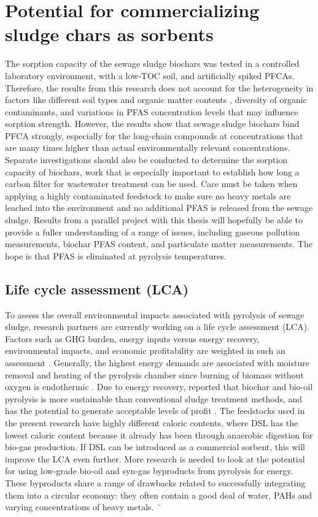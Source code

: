 \section{Potential for commercializing sludge chars as sorbents}
The sorption capacity of the sewage sludge biochars was tested in a controlled laboratory environment, with a low-TOC soil, and artificially spiked PFCAs. Therefore, the results from this research does not account for the heterogeneity in factors like different soil types and organic matter contents \citep{Sormo2021}, diversity of organic contaminants, and variations in PFAS concentration levels that may influence sorption strength. However, the results show that sewage sludge biochars bind PFCA strongly, especially for the long-chain compounds at concentrations that are many times higher than actual environmentally relevant concentrations. Separate investigations should also be conducted to determine the sorption capacity of biochars, work that is especially important to establish how long a carbon filter for wastewater treatment can be used. Care must be taken when applying a highly contaminated feedstock to make sure no heavy metals are leached into the environment and no additional PFAS is released from the sewage sludge. Results from a parallel project with this thesis will hopefully be able to provide a fuller understanding of a range of issues, including gaseous pollution measurements, biochar PFAS content, and particulate matter measurements. The hope is that PFAS is eliminated at pyrolysis temperatures.

\subsection{Life cycle assessment (LCA) \label{sec:LCA}}
To assess the overall environmental impacts associated with pyrolysis of sewage sludge, research partners are currently working on a life cycle assessment (LCA). Factors such as GHG burden, energy inputs versus energy recovery, environmental impacts, and economic profitability are weighted in such an assessment \citep{huang2022comparative}. Generally, the highest energy demands are associated with moisture removal and heating of the pyrolysis chamber since burning of biomass without oxygen is endothermic \citep{mcnamara2016pyrolysis}. Due to energy recovery, \cite{huang2022comparative} reported that biochar and bio-oil pyrolysis is more sustainable than conventional sludge treatment methods, and has the potential to generate acceptable levels of profit \cite{huang2022comparative}. The feedstocks used in the present research have highly different caloric contents, where DSL has the lowest caloric content because it already has been through anaerobic digestion for bio-gas production. If DSL can be introduced as a commercial sorbent, this will improve the LCA even further. More research is needed to look at the potential for using low-grade bio-oil and syn-gas byproducts from pyrolysis for energy. These byproducts share a range of drawbacks related to successfully integrating them into a circular economy: they often contain a good deal of water, PAHs and varying concentrations of heavy metals. ¨

